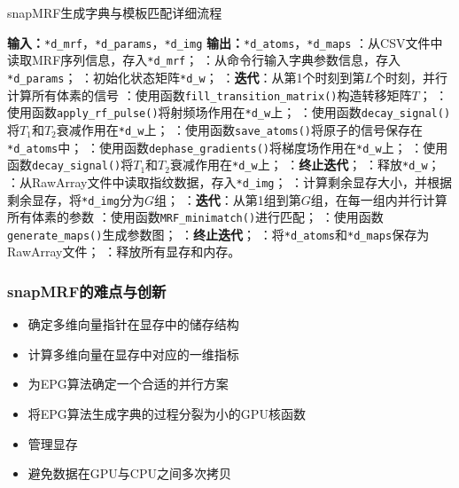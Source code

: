\documentclass{beamer}
\newcommand{\INDSTATE}[1][1]{\STATE\hspace{#1\algorithmicindent}}
\begin{document}
\begin{frame}
{\begin{minipage}{0.5\linewidth}
	\end{minipage}
	\hspace{1.5cm}
	\begin{minipage}{1.2\linewidth}
	\begin{algorithm}[H]
	\caption{snapMRF生成字典与模板匹配详细流程}
	\label{alg:snapMRF}
	\begin{algorithmic}
		\INDSTATE[-1] \textbf{输入：}\texttt{*d\_mrf}，\texttt{*d\_params}，\texttt{*d\_img}
		\INDSTATE[-1] \textbf{输出：}\texttt{*d\_atoms}，\texttt{*d\_maps}
		：从CSV文件中读取MRF序列信息，存入\texttt{*d\_mrf}；
		：从命令行输入字典参数信息，存入\texttt{*d\_params}；
		：初始化状态矩阵\texttt{*d\_w}；
		：\textbf{迭代}：从第1个时刻到第$L$个时刻，并行计算所有体素的信号
		：\qquad 使用函数\texttt{fill\_transition\_matrix()}构造转移矩阵$T$；
		：\qquad 使用函数\texttt{apply\_rf\_pulse()}将射频场作用在\texttt{*d\_w}上；
		：\qquad 使用函数\texttt{decay\_signal()}将$T_1$和$T_2$衰减作用在\texttt{*d\_w}上；
		：\qquad 使用函数\texttt{save\_atoms()}将原子的信号保存在\texttt{*d\_atoms}中；
		：\qquad 使用函数\texttt{dephase\_gradients()}将梯度场作用在\texttt{*d\_w}上；
		：\qquad 使用函数\texttt{decay\_signal()}将$T_1$和$T_2$衰减作用在\texttt{*d\_w}上；
		：\textbf{终止迭代}；
		：释放\texttt{*d\_w}；
		：从RawArray文件中读取指纹数据，存入\texttt{*d\_img}；
		：计算剩余显存大小，并根据剩余显存，将\texttt{*d\_img}分为$G$组；
		：\textbf{迭代}：从第1组到第$G$组，在每一组内并行计算所有体素的参数
		：\qquad 使用函数\texttt{MRF\_minimatch()}进行匹配；
		：\qquad 使用函数\texttt{generate\_maps()}生成参数图；
		：\textbf{终止迭代}；
		：将\texttt{*d\_atoms}和\texttt{*d\_maps}保存为RawArray文件；
		：释放所有显存和内存。
	\end{algorithmic}
\end{algorithm}
\end{minipage}}
\end{frame}

\begin{frame}
	\frametitle{snapMRF的难点与创新}
	\begin{itemize}
		\item 确定多维向量指针在显存中的储存结构
		\item 计算多维向量在显存中对应的一维指标
		\item 为EPG算法确定一个合适的并行方案
		\item 将EPG算法生成字典的过程分裂为小的GPU核函数
		\item 管理显存
		\item 避免数据在GPU与CPU之间多次拷贝
	\end{itemize}
\end{frame}
\end{document}
